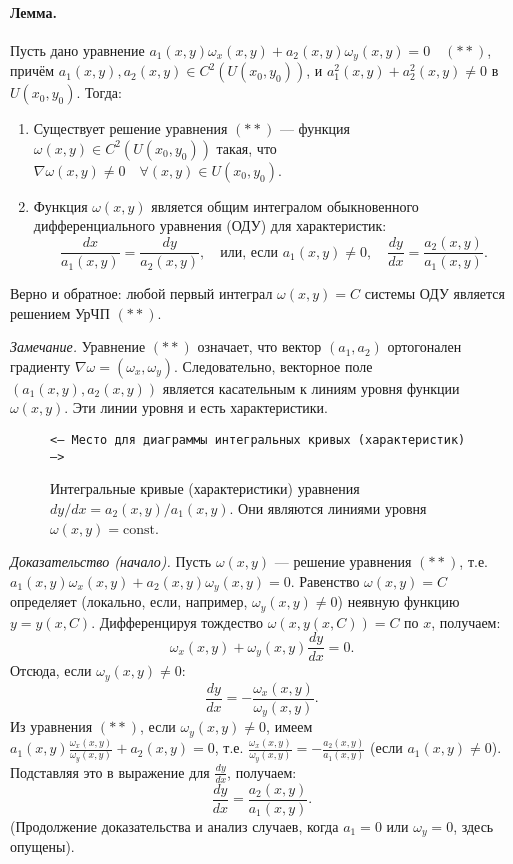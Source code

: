 \documentclass[12pt, a4paper]{article}
\begin{document}
\paragraph{Лемма.}
Пусть дано уравнение $a_1(x,y)\omega_x(x,y) + a_2(x,y)\omega_y(x,y) = 0 \quad (**)$, причём $a_1(x,y), a_2(x,y) \in C^2(U(x_0,y_0))$, и $a_1^2(x,y) + a_2^2(x,y) \neq 0$ в $U(x_0,y_0)$.
Тогда:
\begin{enumerate}
    \item Существует решение уравнения $(**)$ --- функция $\omega(x,y) \in C^2(U(x_0,y_0))$ такая, что $\nabla \omega(x,y) \neq 0 \quad \forall (x,y) \in U(x_0,y_0)$.
    \item Функция $\omega(x,y)$ является общим интегралом обыкновенного дифференциального уравнения (ОДУ) для характеристик:
    \[ 
        \frac{dx}{a_1(x,y)} = \frac{dy}{a_2(x,y)}, \quad \text{или, если } a_1(x,y) \neq 0, \quad \frac{dy}{dx} = \frac{a_2(x,y)}{a_1(x,y)}.
    \]
\end{enumerate}
Верно и обратное: любой первый интеграл $\omega(x,y)=C$ системы ОДУ является решением УрЧП $(**)$.

\textit{Замечание.} Уравнение $(**)$ означает, что вектор $(a_1, a_2)$ ортогонален градиенту $\nabla \omega = (\omega_x, \omega_y)$. Следовательно, векторное поле $(a_1(x,y), a_2(x,y))$ является касательным к линиям уровня функции $\omega(x,y)$. Эти линии уровня и есть характеристики.

\begin{figure}[h!]
    \centering
    \texttt{<--- Место для диаграммы интегральных кривых (характеристик) --->}
    \caption{Интегральные кривые (характеристики) уравнения $dy/dx = a_2(x,y)/a_1(x,y)$. Они являются линиями уровня $\omega(x,y)=\text{const}$.}
\end{figure}

\textit{Доказательство (начало).}
Пусть $\omega(x,y)$ --- решение уравнения $(**)$, т.е. $a_1(x,y)\omega_x(x,y) + a_2(x,y)\omega_y(x,y) = 0$.
Равенство $\omega(x,y)=C$ определяет (локально, если, например, $\omega_y(x,y) \neq 0$) неявную функцию $y=y(x,C)$. Дифференцируя тождество $\omega(x, y(x,C)) = C$ по $x$, получаем:
\[
    \omega_x(x,y) + \omega_y(x,y) \frac{dy}{dx} = 0.
\]
Отсюда, если $\omega_y(x,y) \neq 0$:
\[
    \frac{dy}{dx} = -\frac{\omega_x(x,y)}{\omega_y(x,y)}.
\]
Из уравнения $(**)$, если $\omega_y(x,y) \neq 0$, имеем $a_1(x,y) \frac{\omega_x(x,y)}{\omega_y(x,y)} + a_2(x,y) = 0$, т.е. $\frac{\omega_x(x,y)}{\omega_y(x,y)} = -\frac{a_2(x,y)}{a_1(x,y)}$ (если $a_1(x,y) \neq 0$).
Подставляя это в выражение для $\frac{dy}{dx}$, получаем:
\[
    \frac{dy}{dx} = \frac{a_2(x,y)}{a_1(x,y)}.
\]
(Продолжение доказательства и анализ случаев, когда $a_1=0$ или $\omega_y=0$, здесь опущены).
\end{document}
